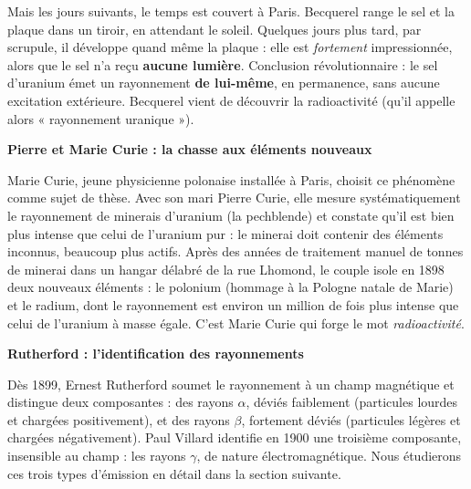 \documentclass[11pt]{article}
\newcommand{\cle}[1]{{\popxbold\color{popdark}#1}}
\begin{document}
Mais les jours suivants, le temps est couvert à Paris. Becquerel range le sel et la plaque dans un tiroir, en attendant le soleil. Quelques jours plus tard, par scrupule, il développe quand même la plaque : elle est \emph{fortement} impressionnée, alors que le sel n'a reçu \textbf{aucune lumière}. Conclusion révolutionnaire : le sel d'uranium émet un rayonnement \textbf{de lui-même}, en permanence, sans aucune excitation extérieure. Becquerel vient de découvrir la radioactivité (qu'il appelle alors « rayonnement uranique »).

\textbf{Pierre et Marie Curie : la chasse aux éléments nouveaux}\par
Marie Curie, jeune physicienne polonaise installée à Paris, choisit ce phénomène comme sujet de thèse. Avec son mari Pierre Curie, elle mesure systématiquement le rayonnement de minerais d'uranium (la pechblende) et constate qu'il est bien plus intense que celui de l'uranium pur : le minerai doit contenir des éléments inconnus, beaucoup plus actifs. Après des années de traitement manuel de tonnes de minerai dans un hangar délabré de la rue Lhomond, le couple isole en 1898 deux nouveaux éléments : le \cle{polonium} (hommage à la Pologne natale de Marie) et le \cle{radium}, dont le rayonnement est environ un million de fois plus intense que celui de l'uranium à masse égale. C'est Marie Curie qui forge le mot \emph{radioactivité}.

\textbf{Rutherford : l'identification des rayonnements}\par
Dès 1899, Ernest Rutherford soumet le rayonnement à un champ magnétique et distingue deux composantes : des rayons $\alpha$, déviés faiblement (particules lourdes et chargées positivement), et des rayons $\beta$, fortement déviés (particules légères et chargées négativement). Paul Villard identifie en 1900 une troisième composante, insensible au champ : les rayons $\gamma$, de nature électromagnétique. Nous étudierons ces trois types d'émission en détail dans la section suivante.
\end{document}
